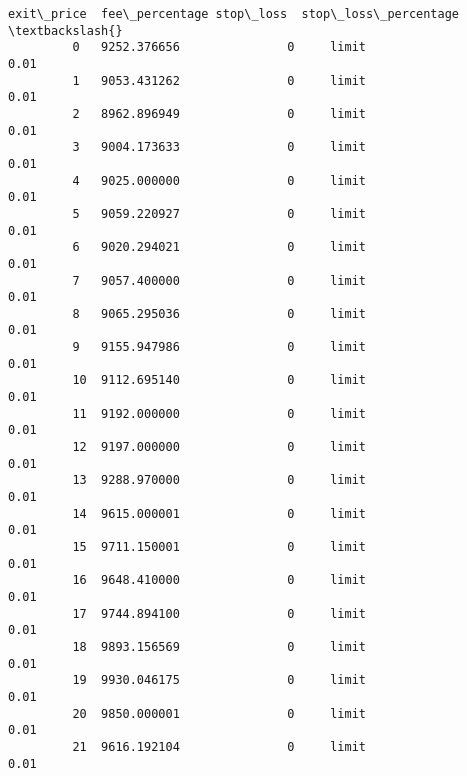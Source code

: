 \documentclass[11pt]{article}
\begin{document}
\begin{Verbatim}[commandchars=\\\{\}]
              exit\_price  fee\_percentage stop\_loss  stop\_loss\_percentage  \textbackslash{}
         0   9252.376656               0     limit                  0.01   
         1   9053.431262               0     limit                  0.01   
         2   8962.896949               0     limit                  0.01   
         3   9004.173633               0     limit                  0.01   
         4   9025.000000               0     limit                  0.01   
         5   9059.220927               0     limit                  0.01   
         6   9020.294021               0     limit                  0.01   
         7   9057.400000               0     limit                  0.01   
         8   9065.295036               0     limit                  0.01   
         9   9155.947986               0     limit                  0.01   
         10  9112.695140               0     limit                  0.01   
         11  9192.000000               0     limit                  0.01   
         12  9197.000000               0     limit                  0.01   
         13  9288.970000               0     limit                  0.01   
         14  9615.000001               0     limit                  0.01   
         15  9711.150001               0     limit                  0.01   
         16  9648.410000               0     limit                  0.01   
         17  9744.894100               0     limit                  0.01   
         18  9893.156569               0     limit                  0.01   
         19  9930.046175               0     limit                  0.01   
         20  9850.000001               0     limit                  0.01   
         21  9616.192104               0     limit                  0.01   
         

\end{Verbatim}
\end{document}
